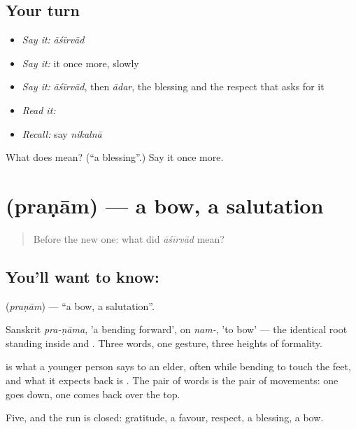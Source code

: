 \subsection*{Your turn}
\begin{itemize}
\raggedright
  \item \emph{Say it:} \emph{āśīrvād}
  \item \emph{Say it:} it once more, slowly
  \item \emph{Say it:} \emph{āśīrvād}, then \emph{ādar}, the blessing and the respect that asks for it
  \item \emph{Read it:} \textbf{}
  \item \emph{Recall:} say \emph{nikalnā}
\end{itemize}

\begin{tcolorbox}[breakable,colback=teal!4,colframe=teal!35!black,title={Before you move on}]
What does  mean? (\textquotedblleft{}a blessing\textquotedblright{}.) Say it once more.
\end{tcolorbox}
\section[\texorpdfstring{\hi{प्रणाम} (praṇām)}{प्रणाम (praṇām)}]{ (praṇām) — a bow, a salutation}

\label{lesson:HI-C50-salutation}



\begin{quote}
Before the new one: what did \emph{āśīrvād} mean?
\end{quote}

\subsection*{You'll want to know: }
\textbf{} (\emph{praṇām}) — \textquotedblleft{}a bow, a salutation\textquotedblright{}.

Sanskrit \emph{pra-ṇāma}, 'a bending forward', on \emph{nam-}, 'to bow' — the identical root standing inside  and . Three words, one gesture, three heights of formality.

 is what a younger person says to an elder, often while bending to touch the feet, and what it expects back is . The pair of words is the pair of movements: one goes down, one comes back over the top.

\begin{grammarlens}[title={What you've built}]
Five, and the run is closed: gratitude, a favour, respect, a blessing, a bow.
\end{grammarlens}

